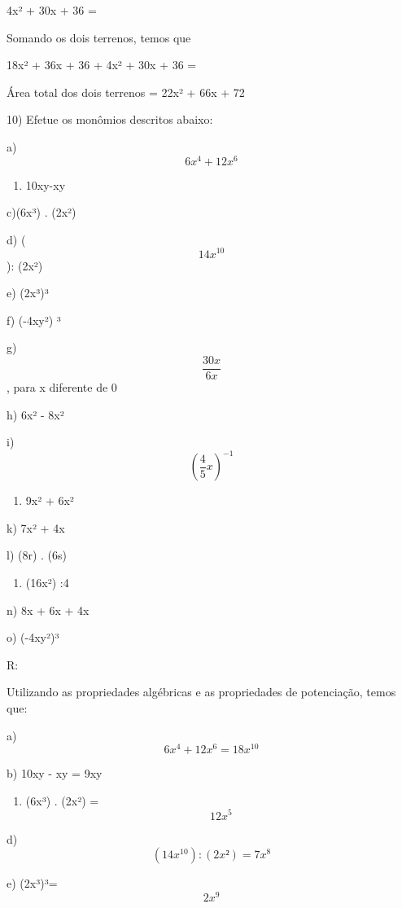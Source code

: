 4x² + 30x + 36 =

Somando os dois terrenos, temos que

18x² + 36x + 36 + 4x² + 30x + 36 =

Área total dos dois terrenos = 22x² + 66x + 72

10) Efetue os monômios descritos abaixo:

a) \[6x^4+ 12x^6\]

\begin{enumerate}
\def\labelenumi{\alph{enumi})}
\setcounter{enumi}{1}
\tightlist
\item
  10xy-xy
\end{enumerate}

c)(6x³) . (2x²)

d) (\[14x^{10}\]): (2x²)

e) (2x³)³

f) (-4xy²) ³

g) \[\frac{30x}{6x}\], para x diferente de 0

h) 6x² - 8x²

i)\[(\frac{4}{5}x)^{-1}\]

\begin{enumerate}
\def\labelenumi{\alph{enumi})}
\setcounter{enumi}{9}
\tightlist
\item
  9x² + 6x²
\end{enumerate}

k) 7x² + 4x

l) (8r) . (6s)

\begin{enumerate}
\def\labelenumi{\alph{enumi})}
\setcounter{enumi}{12}
\tightlist
\item
  (16x²) :4
\end{enumerate}

n) 8x + 6x + 4x

o) (-4xy²)³

R:

Utilizando as propriedades algébricas e as propriedades de potenciação,
temos que:

a) \[6x^4 + 12x^6 = 18x^{10}\]

b) 10xy - xy = 9xy

\begin{enumerate}
\def\labelenumi{\alph{enumi})}
\setcounter{enumi}{2}
\tightlist
\item
  (6x³) . (2x²) = \[12x^5\]
\end{enumerate}

d) \[(14x^10) : (2x²)=7x^8\]

e) (2x³)³= \[2x^9\]

